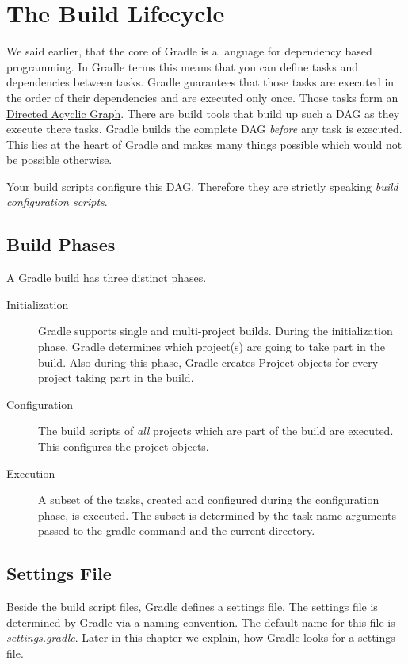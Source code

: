 \chapter{The Build Lifecycle} %
\label{cha:the_build_lifecycle}
We said earlier, that the core of Gradle is a language for dependency based programming. In Gradle terms this means that you can define tasks and dependencies between tasks. Gradle guarantees that those tasks are executed in the order of their dependencies and are executed only once. Those tasks form an \href{http://en.wikipedia.org/wiki/Directed_acyclic_graph}{Directed Acyclic Graph}. There are build tools that build up such a DAG as they execute there tasks. Gradle builds the complete DAG \emph{before} any task is executed. This lies at the heart of Gradle and makes many things possible which would not be possible otherwise. 

Your build scripts configure this DAG. Therefore they are strictly speaking \emph{build configuration scripts}.    

\section{Build Phases} %
\label{sec:build_phases}
A Gradle build has three distinct phases.
\begin{description}
	\item[Initialization] Gradle supports single and multi-project builds. During the initialization phase, Gradle determines which project(s) are going to take part in the build. Also during this phase, Gradle creates Project objects for every project taking part in the build. 
	\item[Configuration] The build scripts of \emph{all} projects which are part of the build are executed. This configures the project objects.
	\item[Execution] A subset of the tasks, created and configured during the configuration phase, is executed. The subset is determined by the task name arguments passed to the gradle command and the current directory.
\end{description}

\section{Settings File} %
\label{sec:settings_file}
Beside the build script files, Gradle defines a settings file. The settings file is determined by Gradle via a naming convention. The default name for this file is \emph{settings.gradle}. Later in this chapter we explain, how Gradle looks for a settings file.

